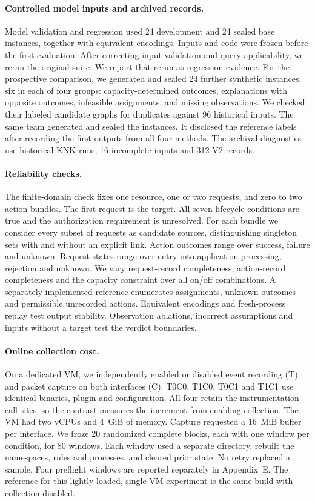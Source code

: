 \paragraph{Controlled model inputs and archived records.}
Model validation and regression used 24 development and 24 sealed base instances, together with equivalent encodings. Inputs and code were frozen before the first evaluation. After correcting input validation and query applicability, we reran the original suite. We report that rerun as regression evidence. For the prospective comparison, we generated and sealed 24 further synthetic instances, six in each of four groups: capacity-determined outcomes, explanations with opposite outcomes, infeasible assignments, and missing observations. We checked their labeled candidate graphs for duplicates against 96 historical inputs. The same team generated and sealed the instances. It disclosed the reference labels after recording the first outputs from all four methods. The archival diagnostics use historical KNK runs, 16 incomplete inputs and 312 V2 records.

\paragraph{Reliability checks.}
The finite-domain check fixes one resource, one or two requests, and zero to two action bundles. The first request is the target. All seven lifecycle conditions are true and the authorization requirement is unresolved. For each bundle we consider every subset of requests as candidate sources, distinguishing singleton sets with and without an explicit link. Action outcomes range over success, failure and unknown. Request states range over entry into application processing, rejection and unknown. We vary request-record completeness, action-record completeness and the capacity constraint over all on/off combinations. A separately implemented reference enumerates assignments, unknown outcomes and permissible unrecorded actions. Equivalent encodings and fresh-process replay test output stability. Observation ablations, incorrect assumptions and inputs without a target test the verdict boundaries.

\paragraph{Online collection cost.}
On a dedicated VM, we independently enabled or disabled event recording (T) and packet capture on both interfaces (C). T0C0, T1C0, T0C1 and T1C1 use identical binaries, plugin and configuration. All four retain the instrumentation call sites, so the contrast measures the increment from enabling collection. The VM had two vCPUs and 4~GiB of memory. Capture requested a 16~MiB buffer per interface. We froze 20 randomized complete blocks, each with one window per condition, for 80 windows. Each window used a separate directory, rebuilt the namespaces, rules and processes, and cleared prior state. No retry replaced a sample. Four preflight windows are reported separately in Appendix~E. The reference for this lightly loaded, single-VM experiment is the same build with collection disabled.

